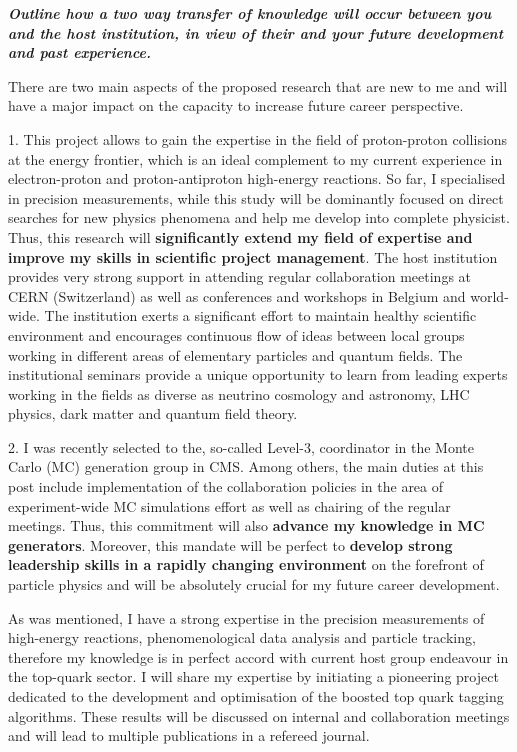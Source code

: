 \begin{center}
\textbf{\textit{{\Large Outline how a two way transfer of knowledge will occur between you and the host institution, in view of their and your future development and past experience.}}}\\
\end{center}
There are two main aspects of the proposed research that are new to me and will have a major impact on the capacity to increase future career perspective. 

1.	This project allows to gain the expertise in the field of proton-proton collisions at the energy frontier, which is an ideal complement to my current experience in electron-proton and proton-antiproton high-energy reactions. So far, I specialised in precision measurements, while this study will be dominantly  focused on direct searches for new physics phenomena and help me develop into complete physicist. Thus, this research will \textbf{significantly extend my field of expertise and improve my skills in scientific project management}. The host institution provides very strong support in attending regular collaboration meetings at CERN (Switzerland) as well as conferences and workshops in Belgium and world-wide. The institution exerts a significant effort to maintain healthy scientific environment and encourages continuous flow of ideas between local groups working in different areas of elementary particles and quantum fields. The institutional seminars provide a unique opportunity to learn from leading experts working in the fields as diverse as neutrino cosmology and astronomy, LHC physics, dark matter and quantum field theory.

2.	I was recently selected to the, so-called Level-3, coordinator in the Monte Carlo (MC) generation group in CMS. Among others, the main duties at this post include implementation of the collaboration policies in the area of experiment-wide MC simulations effort as well as chairing of the regular meetings. Thus, this commitment will also \textbf{advance my knowledge in MC generators}. Moreover, this mandate will be perfect to \textbf{develop strong leadership skills in a rapidly changing environment} on the forefront of particle physics and will be absolutely crucial for my future career development.

As was mentioned, I have a strong expertise in the precision measurements of high-energy reactions, phenomenological data analysis and particle tracking, therefore my knowledge is in perfect accord with current host group endeavour in the top-quark sector. I will share my expertise by initiating a pioneering project dedicated to the development and optimisation of the boosted top quark tagging algorithms. These results will be discussed on internal and collaboration meetings and will lead to multiple publications in a refereed journal.

